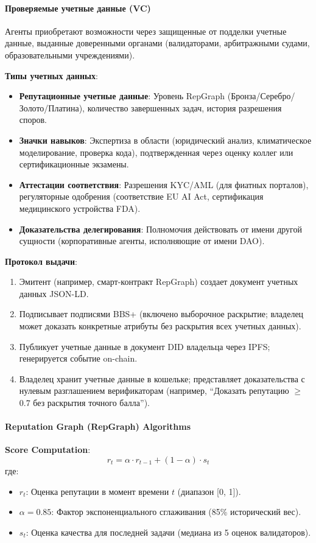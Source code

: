 \documentclass[11pt]{article}
\begin{document}
\paragraph{Проверяемые учетные данные (VC)}
Агенты приобретают возможности через защищенные от подделки учетные данные, выданные доверенными органами (валидаторами, арбитражными судами, образовательными учреждениями).

\textbf{Типы учетных данных}:
\begin{itemize}[noitemsep]
  \item \textbf{Репутационные учетные данные}: Уровень RepGraph (Бронза/Серебро/Золото/Платина), количество завершенных задач, история разрешения споров.
  \item \textbf{Значки навыков}: Экспертиза в области (юридический анализ, климатическое моделирование, проверка кода), подтвержденная через оценку коллег или сертификационные экзамены.
  \item \textbf{Аттестации соответствия}: Разрешения KYC/AML (для фиатных порталов), регуляторные одобрения (соответствие EU AI Act, сертификация медицинского устройства FDA).
  \item \textbf{Доказательства делегирования}: Полномочия действовать от имени другой сущности (корпоративные агенты, исполняющие от имени DAO).
\end{itemize}

\textbf{Протокол выдачи}:
\begin{enumerate}[noitemsep]
  \item Эмитент (например, смарт-контракт RepGraph) создает документ учетных данных JSON-LD.
  \item Подписывает подписями BBS+ (включено выборочное раскрытие; владелец может доказать конкретные атрибуты без раскрытия всех учетных данных).
  \item Публикует учетные данные в документ DID владельца через IPFS; генерируется событие on-chain.
  \item Владелец хранит учетные данные в кошельке; представляет доказательства с нулевым разглашением верификаторам (например, ``Доказать репутацию $\geq$ 0.7 без раскрытия точного балла'').
\end{enumerate}

\paragraph{Reputation Graph (RepGraph) Algorithms}

\textbf{Score Computation}:
\begin{equation}
r_t = \alpha \cdot r_{t-1} + (1 - \alpha) \cdot s_t
\end{equation}
где:
\begin{itemize}[noitemsep]
  \item $r_t$: Оценка репутации в момент времени $t$ (диапазон [0, 1]).
  \item $\alpha = 0.85$: Фактор экспоненциального сглаживания (85\% исторический вес).
  \item $s_t$: Оценка качества для последней задачи (медиана из 5 оценок валидаторов).
\end{itemize}
\end{document}
